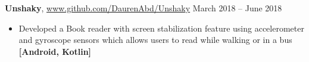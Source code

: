 \cveventflat
{\textbf{Unshaky}, }
{{\href{https://www.github.com/DaurenAbd/Unshaky/}{www.github.com/DaurenAbd/Unshaky}}}
{March 2018 -- June 2018}{}
\begin{itemize}
    \item Developed a Book reader with screen stabilization feature using accelerometer and gyroscope sensors which allows users to read while walking or in a bus
    \textbf{[Android, Kotlin]}
\end{itemize}
